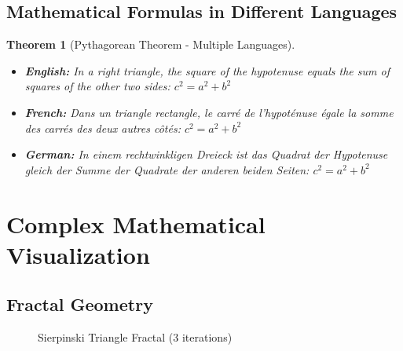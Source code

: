 \documentclass[12pt,a4paper,twoside]{article}
\newtheorem{theorem}{Theorem}[section]
\theoremstyle{definition}
\begin{document}
\subsection{Mathematical Formulas in Different Languages}

\begin{theorem}[Pythagorean Theorem - Multiple Languages]
\begin{itemize}
\item \textbf{English:} In a right triangle, the square of the hypotenuse equals the sum of squares of the other two sides: $c^2 = a^2 + b^2$
\item \textbf{French:} Dans un triangle rectangle, le carré de l'hypoténuse égale la somme des carrés des deux autres côtés: $c^2 = a^2 + b^2$
\item \textbf{German:} In einem rechtwinkligen Dreieck ist das Quadrat der Hypotenuse gleich der Summe der Quadrate der anderen beiden Seiten: $c^2 = a^2 + b^2$
\end{itemize}
\end{theorem}

\section{Complex Mathematical Visualization}

\subsection{Fractal Geometry}

\begin{figure}[H]
\centering
{}
\caption{Sierpinski Triangle Fractal (3 iterations)}
\label{fig:fractal}
\end{figure}
\end{document}
